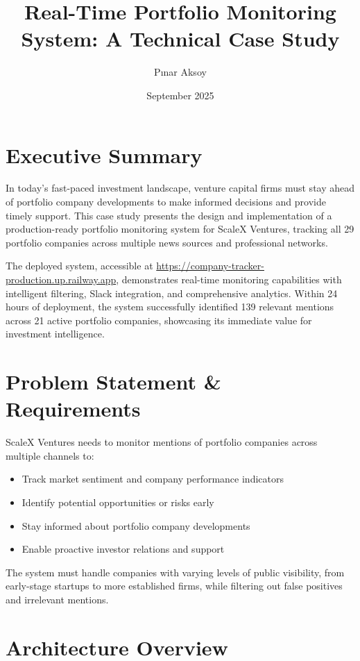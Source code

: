 \documentclass[11pt]{article}
\title{Real-Time Portfolio Monitoring System: A Technical Case Study}
\author{Pınar Aksoy}
\date{September 2025}
\begin{document}
\maketitle

\section{Executive Summary}

In today's fast-paced investment landscape, venture capital firms must stay ahead of portfolio company developments to make informed decisions and provide timely support. This case study presents the design and implementation of a production-ready portfolio monitoring system for ScaleX Ventures, tracking all 29 portfolio companies across multiple news sources and professional networks.

The deployed system, accessible at \url{https://company-tracker-production.up.railway.app}, demonstrates real-time monitoring capabilities with intelligent filtering, Slack integration, and comprehensive analytics. Within 24 hours of deployment, the system successfully identified 139 relevant mentions across 21 active portfolio companies, showcasing its immediate value for investment intelligence.

\section{Problem Statement \& Requirements}

ScaleX Ventures needs to monitor mentions of portfolio companies across multiple channels to:
\begin{itemize}
    \item Track market sentiment and company performance indicators
    \item Identify potential opportunities or risks early
    \item Stay informed about portfolio company developments
    \item Enable proactive investor relations and support
\end{itemize}

The system must handle companies with varying levels of public visibility, from early-stage startups to more established firms, while filtering out false positives and irrelevant mentions.

\section{Architecture Overview}
\end{document}
